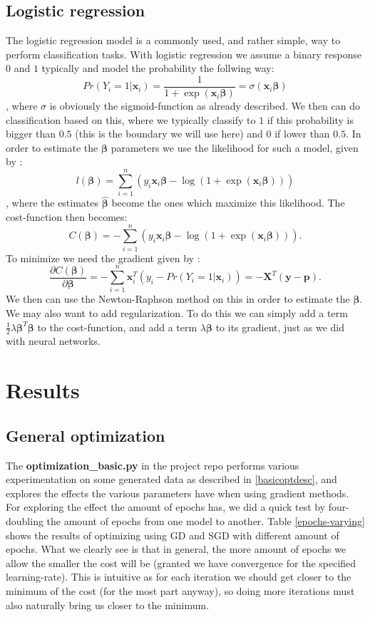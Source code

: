 \documentclass{article}
\begin{document}
\subsection{Logistic regression}
The logistic regression model is a commonly used, and rather simple, way to
perform classification tasks. With logistic regression we assume a binary
response $0$ and $1$ typically and model the probability the follwing way:
$$Pr(Y_i = 1 | \bm{x}_i) = \frac{1}{1 + \exp(\bm{x}_i \bm{\beta})} = \sigma(\bm{x}_i \bm{\beta})$$
, where $\sigma$ is obviously the sigmoid-function as already described. We then
can do classification based on this, where we typically classify to $1$ if this
probability is bigger than $0.5$ (this is the boundary we will use here) and $0$
if lower than $0.5$. In order to estimate the $\bm{\beta}$ parameters we use the
likelihood for such a model, given by \cite[s.~4.4]{hastie2009elements}:
$$l(\bm{\beta}) = \sum_{i=1}^{n} (y_i \bm{x}_i \bm{\beta} - \log(1 + \exp(\bm{x}_i \bm{\beta})))$$
, where the estimates $\hat{\bm{\beta}}$ become the ones which maximize this
likelihood. The cost-function then becomes:
$$C(\bm{\beta}) = -\sum_{i=1}^{n} (y_i \bm{x}_i \bm{\beta} - \log(1 + \exp(\bm{x}_i \bm{\beta}))).$$
To minimize we need the gradient given by \cite[s.~4.4]{hastie2009elements}:
$$\frac{\partial C(\bm{\beta})}{\partial \bm{\beta}} = -\sum_{i=1}^{n}\bm{x}_i^T(y_i - Pr(Y_i = 1 | \bm{x}_i)) = -\bm{X}^T(\bm{y} - \bm{p}).$$
We then can use the Newton-Raphson method on this in order to estimate the $\bm{\beta}$.
\\

We may also want to add regularization. To do this we can simply add a term
$\frac{1}{2}\lambda \bm{\beta}^T \bm{\beta}$ to the cost-function, and add a term
$\lambda \bm{\beta}$ to its gradient, just as we did with neural networks.

\section{Results}

\subsection{General optimization}
The \textbf{optimization\_basic.py} in the project repo
\cite{githubrepoproject2code} performs various experimentation on some generated
data as described in \ref{basicoptdesc}, and explores the effects the
various parameters have when using gradient methods. For exploring the effect
the amount of epochs has, we did a quick test by four-doubling the amount of
epochs from one model to another. Table \ref{epochs-varying} shows the results
of optimizing using GD and SGD with different amount of epochs. What we clearly
see is that in general, the more amount of epochs we allow the smaller the cost
will be (granted we have convergence for the specified learning-rate). This is intuitive
as for each iteration we should get closer to the minimum of the cost (for the
most part anyway), so doing more iterations must also naturally bring us closer
to the minimum.
\end{document}
